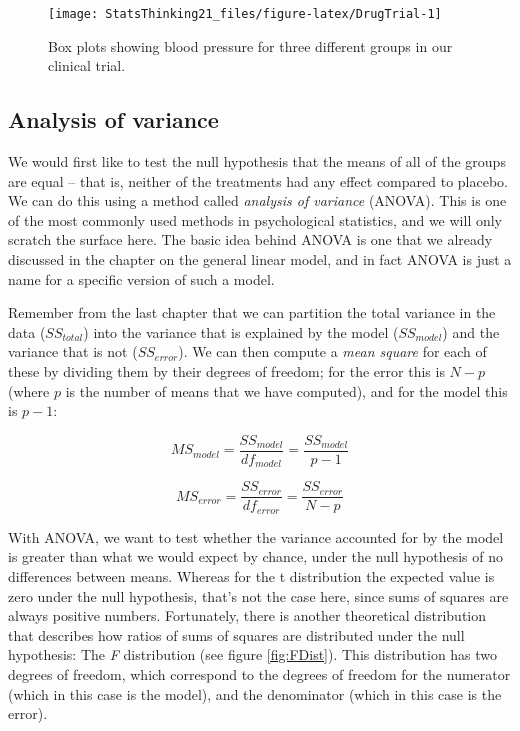 \documentclass[12pt,]{book}
\theoremstyle{definition}
\theoremstyle{definition}
\theoremstyle{definition}
\theoremstyle{remark}
\begin{document}
\begin{figure}
\texttt{[image: StatsThinking21\_files/figure-latex/DrugTrial-1]} \caption{Box plots showing blood pressure for three different groups in our clinical trial.}\label{fig:DrugTrial}
\end{figure}

\hypertarget{ANOVA}{%
\subsection{Analysis of variance}\label{ANOVA}}

We would first like to test the null hypothesis that the means of all of the groups are equal -- that is, neither of the treatments had any effect compared to placebo. We can do this using a method called \emph{analysis of variance} (ANOVA). This is one of the most commonly used methods in psychological statistics, and we will only scratch the surface here. The basic idea behind ANOVA is one that we already discussed in the chapter on the general linear model, and in fact ANOVA is just a name for a specific version of such a model.

Remember from the last chapter that we can partition the total variance in the data (\(SS_{total}\)) into the variance that is explained by the model (\(SS_{model}\)) and the variance that is not (\(SS_{error}\)). We can then compute a \emph{mean square} for each of these by dividing them by their degrees of freedom; for the error this is \(N - p\) (where \(p\) is the number of means that we have computed), and for the model this is \(p - 1\):

\[
MS_{model} =\frac{SS_{model}}{df_{model}}= \frac{SS_{model}}{p-1}
\]

\[
MS_{error} = \frac{SS_{error}}{df_{error}} = \frac{SS_{error}}{N - p}
\]

With ANOVA, we want to test whether the variance accounted for by the model is greater than what we would expect by chance, under the null hypothesis of no differences between means. Whereas for the t distribution the expected value is zero under the null hypothesis, that's not the case here, since sums of squares are always positive numbers. Fortunately, there is another theoretical distribution that describes how ratios of sums of squares are distributed under the null hypothesis: The \emph{F} distribution (see figure \ref{fig:FDist}). This distribution has two degrees of freedom, which correspond to the degrees of freedom for the numerator (which in this case is the model), and the denominator (which in this case is the error).
\end{document}
